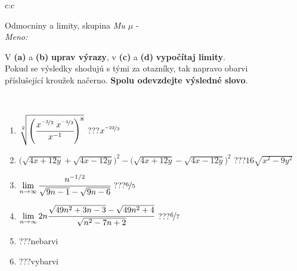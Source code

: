 \documentclass[10pt]{report}
\begin{document}
\newpage
\thispagestyle{empty}
\begin{tabular}{c:c}
\begin{minipage}[c][104.5mm][t]{0.5\linewidth}
\begin{center}
\vspace{7mm}
{\huge Odmocniny a limity, skupina \textit{Mu $\mu$} -}\\[5mm]
\textit{Meno:}\phantom{xxxxxxxxxxxxxxxxxxxxxxxxxxxxxxxxxxxxxxxxxxxxxxxxxxxxxxxxxxxxxxxxx}\\[5mm]
\begin{minipage}{0.95\linewidth}
\begin{center}
V \textbf{(a)} a \textbf{(b)} \textbf{uprav výrazy}, v \textbf{(c)} a \textbf{(d)} \textbf{vypočítaj limity}.\\Pokud se výsledky shodujú s tými za otazníky, tak napravo obarvi\\příslušející kroužek načerno. \textbf{Spolu odevzdejte výsledné slovo}.
\end{center}
\end{minipage}
\\[1mm]
\begin{minipage}{0.79\linewidth}
\begin{center}
\begin{varwidth}{\linewidth}
\begin{enumerate}
\small
\item $\sqrt[2]{\left(\cfrac{x^{\nicefrac{-3}{2}}\;x^{\nicefrac{-4}{3}}}{x^{-1}}\right)^{8}}$\quad \dotfill\; ???\;\dotfill \quad $x^{\nicefrac{-22}{3}}$
\item {\footnotesize{\scriptsize$\big(\sqrt{4x+12y}+\sqrt{4x-12y}\big)^2-\big(\sqrt{4x+12y}-\sqrt{4x-12y}\big)^2$}\quad \dotfill\; ???\;\dotfill \quad $16\sqrt{x^2-9y^2}$}
\item $\lim\limits_{n\to\infty}\cfrac{n^{-1/2}}{\sqrt{9n-1}-\sqrt{9n-6}}$\quad \dotfill\; ???\;\dotfill \quad $\nicefrac{6}{5}$
\item $\lim\limits_{n\to\infty}2n\cfrac{\sqrt{49n^2+3n-3}-\sqrt{49n^2+4}}{\sqrt{n^2-7n+2}}$\quad \dotfill\; ???\;\dotfill \quad $\nicefrac{6}{7}$
\item \quad \dotfill\; ???\;\dotfill \quad nebarvi
\item \quad \dotfill\; ???\;\dotfill \quad vybarvi
\end{enumerate}
\end{varwidth}
\end{center}
\end{minipage}
\begin{minipage}{0.20\linewidth}

\end{minipage}
\end{center}
\end{minipage}
\end{tabular}
\end{document}
